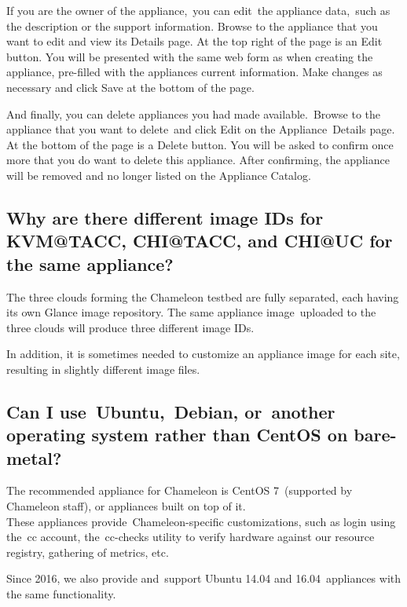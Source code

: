 If you are the owner of the appliance,~you can edit~the appliance
data,~such as the description or the support information. Browse to the
appliance that you want to edit and view its Details page. At the top
right of the page is an Edit button. You will be presented with the same
web form as when creating the appliance, pre-filled with the appliances
current information. Make changes as necessary and click Save at the
bottom of the page.

And finally, you can delete appliances you had made available.~{Browse
to the appliance that you want to delete~and click Edit on the
Appliance~Details page. At the bottom of the page is a Delete button.
You will be asked to confirm once more that you do want to delete this
appliance}. After confirming, the appliance will be removed and no
longer listed on the Appliance Catalog.

\subsection{Why are there different image IDs for KVM@TACC, CHI@TACC, and
CHI@UC for the same
appliance?}\label{why-are-there-different-image-ids-for-kvmtacc-chitacc-and-chiuc-for-the-same-appliance}

The three clouds forming the Chameleon testbed are fully separated, each
having its own Glance image repository. The same appliance
image~uploaded to the three clouds will produce three different image
IDs.

In addition, it is sometimes needed to customize an appliance image for
each site, resulting in slightly different image files.

\subsection{Can I use~Ubuntu,~Debian, or~another operating system rather
than CentOS on
bare-metal?}\label{can-i-useubuntudebian-oranother-operating-system-rather-than-centos-on-bare-metal}

The recommended appliance for Chameleon is CentOS 7~(supported by
Chameleon staff), or appliances built on top of it.\\
These appliances provide~Chameleon-specific customizations, such as
login using the~cc account, the~cc-checks utility to verify hardware
against our resource registry, gathering of metrics, etc.

Since 2016, we also provide and~support Ubuntu 14.04 and
16.04~appliances with the same functionality.

